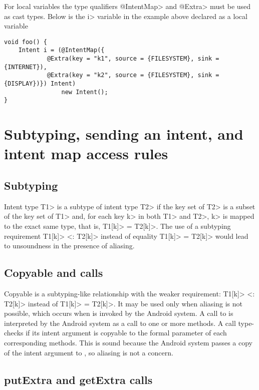 For local variables the type qualifiers \<@IntentMap> and \<@Extra> must be used
as cast types. Below is the \<i> variable in the example above declared as
a local variable

\begin{Verbatim}
void foo() {
    Intent i = (@IntentMap({
            @Extra(key = "k1", source = {FILESYSTEM}, sink = {INTERNET}),
            @Extra(key = "k2", source = {FILESYSTEM}, sink = {DISPLAY})}) Intent)
                new Intent();
}
\end{Verbatim}



\section{Subtyping, sending an intent, and intent map access rules}

\subsection{Subtyping}
Intent type \<T1> is a subtype of intent type \<T2> if the key set of 
\<T2> is a subset of the key set of \<T1> and, for each key \<k> in both 
\<T1> and \<T2>, \<k> is mapped to the exact same type, that is, 
\<T1[k]> = \<T2[k]>. The use of a subtyping requirement \<T1[k]> <: \<T2[k]> 
instead of equality \<T1[k]> = \<T2[k]> would lead to unsoundness 
in the presence of aliasing.


\subsection{Copyable and \sendIntent{} calls}
Copyable is a subtyping-like relationship with the weaker requirement: 
\<T1[k]> <: \<T2[k]> instead of \<T1[k]> = \<T2[k]>.
It may be used only when aliasing is not possible, which
occurs when \onReceive{} is invoked by the Android system. A call to
\sendIntent{} is interpreted by the Android system as a call to one or more
\onReceive{} methods. A \sendIntent{} call type-checks if its intent argument is
copyable to the formal parameter of each corresponding \onReceive{} methods.
This is sound because the Android system passes a copy of the intent argument to
\onReceive{}, so aliasing is not a concern.

\subsection{putExtra and getExtra calls}

